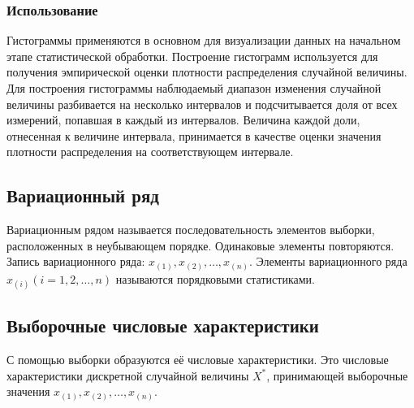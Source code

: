 \subsubsection{Использование}
Гистограммы применяются в основном для визуализации данных на начальном этапе статистической обработки. \newline Построение гистограмм используется для получения эмпирической оценки плотности распределения случайной величины. Для построения гистограммы наблюдаемый диапазон изменения случайной величины разбивается на несколько интервалов и подсчитывается доля от всех измерений, попавшая в каждый из интервалов. Величина каждой доли, отнесенная к величине интервала, принимается в качестве оценки значения плотности распределения на соответствующем интервале.

\subsection{Вариационный ряд}
Вариационным рядом называется последовательность элементов выборки, расположенных в неубывающем порядке. Одинаковые элементы повторяются.
Запись вариационного ряда: $x_{(1)}, x_{(2)}, \ldots, x_{(n)}$.
Элементы вариационного ряда $x_{(i)} (i = 1, 2, \ldots, n)$ называются порядковыми статистиками.

\subsection{Выборочные числовые характеристики}
С помощью выборки образуются её числовые характеристики. Это числовые характеристики дискретной случайной величины $X^{*}$, принимающей выборочные значения $x_{(1)}, x_{(2)}, \ldots, x_{(n)}$.


